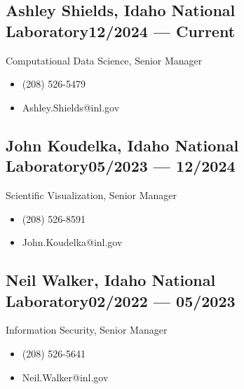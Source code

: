 \documentclass[letterpaper,11pt]{article}
\begin{document}
\subsection*{{\color{cvblue}Ashley Shields,} Idaho National Laboratory\hfill 12/2024 --- Current}
Computational Data Science, Senior Manager
\begin{itemize}
    \setlength{\itemsep}{-.5pt}
    \item (208) 526-5479
    \item Ashley.Shields@inl.gov
\end{itemize}
 
\subsection*{{\color{cvblue}John Koudelka,} Idaho National Laboratory\hfill 05/2023 --- 12/2024}
Scientific Visualization, Senior Manager
\begin{itemize}
    \setlength{\itemsep}{-.5pt}
    \item (208) 526-8591
    \item John.Koudelka@inl.gov
\end{itemize}
 
\subsection*{{\color{cvblue}Neil Walker,} Idaho National Laboratory\hfill 02/2022 --- 05/2023}
Information Security, Senior Manager
\begin{itemize}
    \setlength{\itemsep}{-.5pt}
    \item (208) 526-5641
    \item Neil.Walker@inl.gov
\end{itemize}
\end{document}

